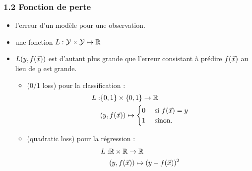 \begin{frame}
  \frametitle{1.2 Fonction de perte}
  \begin{itemize}
  \item {} l'erreur d'un modèle pour une observation.
  \item {} une fonction
    $L : \mathcal{Y} \times \mathcal{Y} \mapsto {\mathbb R}$ 
  \item[] $L(y, f(\vec{x}))$ est d'autant plus grande que l'erreur consistant à
    prédire $f(\vec{x})$ au lieu de $y$ est grande.
    \pause
    \begin{itemize}
    \item {} \textcolor{gray!70}{(0/1 loss)} pour la classification :
      \begin{eqnarray*}
        L : & \{0, 1\} \times \{0, 1\} \rightarrow {\mathbb R} \\ \nonumber
            & (y, f(\vec{x})) \mapsto
              \begin{cases}
                0 & \text{ si } f(\vec{x}) = y \\ \nonumber
                1 & \text{ sinon.}
              \end{cases}                
      \end{eqnarray*}
      \pause
    \item {} \textcolor{gray!70}{(quadratic loss)} pour la régression :
      \begin{eqnarray*}
        L : & {\mathbb R} \times {\mathbb R} \rightarrow {\mathbb R} \\ \nonumber
            & (y, f(\vec{x})) \mapsto (y - f(\vec{x}))^2
      \end{eqnarray*}      
    \end{itemize}
  \end{itemize}
\end{frame}

